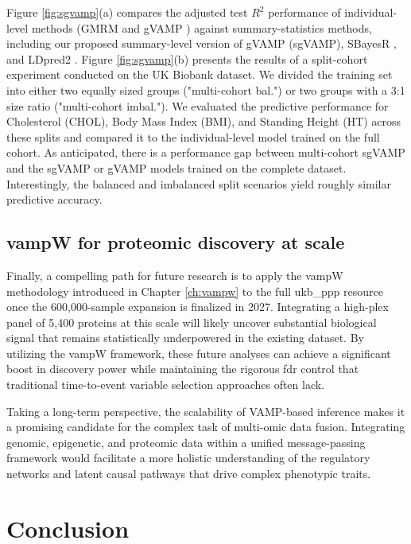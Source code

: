 Figure \ref{fig:sgvamp}(a) compares the adjusted test $R^2$ performance of individual-level methods (GMRM \cite{bayesrc} and gVAMP \cite{Depope2026}) against summary-statistics methods, including our proposed summary-level version of gVAMP (sgVAMP), SBayesR \cite{sbayesr}, and LDpred2 \cite{ldpred}. Figure \ref{fig:sgvamp}(b) presents the results of a split-cohort experiment conducted on the UK Biobank dataset. We divided the training set into either two equally sized groups ("multi-cohort bal.") or two groups with a 3:1 size ratio ("multi-cohort imbal."). We evaluated the predictive performance for Cholesterol (CHOL), Body Mass Index (BMI), and Standing Height (HT) across these splits and compared it to the individual-level model trained on the full cohort. As anticipated, there is a performance gap between multi-cohort sgVAMP and the sgVAMP or gVAMP models trained on the complete dataset. Interestingly, the balanced and imbalanced split scenarios yield roughly similar predictive accuracy.

\subsection{vampW for proteomic discovery at scale}

Finally, a compelling path for future research is to apply the vampW methodology introduced in Chapter \ref{ch:vampw} to the full \gls{ukb_ppp} resource once the 600,000-sample expansion is finalized in 2027. Integrating a high-plex panel of 5,400 proteins at this scale will likely uncover substantial biological signal that remains statistically underpowered in the existing dataset. By utilizing the vampW framework, these future analyses can achieve a significant boost in discovery power while maintaining the rigorous \acrlong{fdr} control that traditional time-to-event variable selection approaches often lack.

Taking a long-term perspective, the scalability of VAMP-based inference makes it a promising candidate for the complex task of multi-omic data fusion. Integrating genomic, epigenetic, and proteomic data within a unified message-passing framework would facilitate a more holistic understanding of the regulatory networks and latent causal pathways that drive complex phenotypic traits.


\section{Conclusion}

